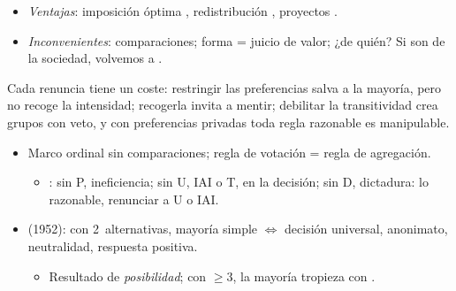 \documentclass{article}
\begin{document}
\begin{columnas}
\begin{itemize}
\item \emph{Ventajas}: imposición óptima , redistribución , proyectos .
\item \emph{Inconvenientes}: comparaciones; forma = juicio de valor; ¿de quién? Si son de la sociedad, volvemos a .
\end{itemize}

\begin{ideaclave}
Cada renuncia tiene un coste: restringir las preferencias salva a la mayoría, pero no recoge la intensidad; recogerla invita a mentir; debilitar la transitividad crea grupos con veto, y con preferencias privadas toda regla razonable es manipulable.
\end{ideaclave}

\begin{itemize}
\item Marco ordinal sin comparaciones; regla de votación = regla de agregación.
  \begin{itemize}
  \item {}: sin P, ineficiencia; sin U, IAI o T, en la decisión; sin D, dictadura: lo razonable, renunciar a U o IAI.
  \end{itemize}
\item {} (1952): con 2~alternativas, mayoría simple $\iff$ decisión universal, anonimato, neutralidad, respuesta positiva.
  \begin{itemize}
  \item Resultado de \emph{posibilidad}; con $\geq3$, la mayoría tropieza con .
  \end{itemize}
\end{itemize}


\end{columnas}
\end{document}

